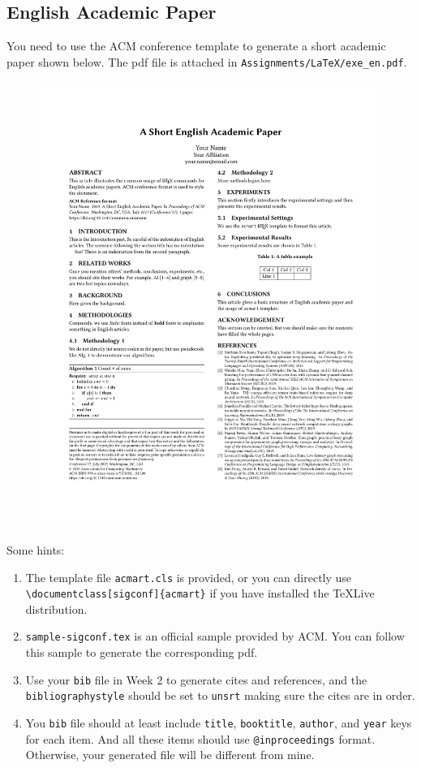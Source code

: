 \documentclass[english]{../TexTemplate/thesis}
\begin{document}
\subsection{English Academic Paper}
You need to use the ACM conference template to generate a short academic paper shown below.
The pdf file is attached in \verb'Assignments/LaTeX/exe_en.pdf'.
\begin{figure}[H]
\centering
\includegraphics[width=0.7\linewidth]{../Assignments/LaTeX/exe_en.pdf}
\end{figure}

Some hints:
\begin{enumerate}
	\item The template file \verb'acmart.cls' is provided, or you can directly use \verb'\documentclass[sigconf]{acmart}' if you have installed the TeXLive distribution.
	\item \verb'sample-sigconf.tex' is an official sample provided by ACM.
	You can follow this sample to generate the corresponding pdf.
	\item Use your \verb'bib' file in Week 2 to generate cites and references, and the \verb'bibliographystyle' should be set to \verb'unsrt' making sure the cites are in order.
	\item You \verb'bib' file should at least include \verb'title', \verb'booktitle', \verb'author', and \verb'year' keys for each item.
	And all these items should use \verb'@inproceedings' format. Otherwise, your generated file will be different from mine.
\end{enumerate}
\end{document}
